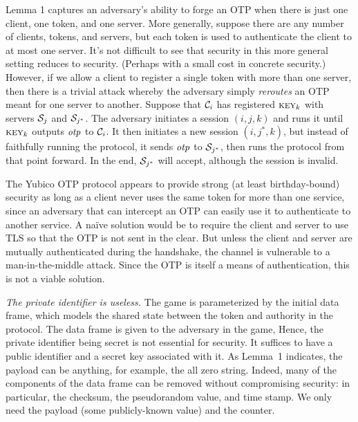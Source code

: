 Lemma 1 captures an adversary's ability to forge an OTP when there is just one
client, one token, and one server. More generally, suppose there are any number
of clients, tokens, and servers, but each token is used to authenticate the
client to at most one server. It's not difficult to see that security in this
more general setting reduces to \forge security. (Perhaps with a small cost in
concrete security.)
%
However, if we allow a client to register a single token with more than
one server, then there is a trivial attack whereby the adversary simply
\emph{reroutes} an OTP meant for one server to another.
%
Suppose that $\mathcal{C}_i$ has registered $\textsc{key}_k$ with servers $\mathcal{S}_j$ and
$\mathcal{S}_{j^*}$.
%
The adversary initiates a session $(i,j,k)$ and runs it until $\textsc{key}_k$ outputs
$\mathit{otp}$ to $\mathcal{C}_i$.
%
It then initiates a new session $(i,j^*,k)$, but instead of faithfully running
the protocol, it sends $\mathit{otp}$ to $\mathcal{S}_{j^*}$, then runs the protocol from that
point forward. In the end, $\mathcal{S}_{j^*}$ will accept, although the session is
invalid.

%
The Yubico OTP protocol appears to provide strong (at least birthday-bound)
security as long as a client never uses the same token for more than one
service, since an adversary that can intercept an OTP can easily use it to
authenticate to another service.
%
A na\"ive solution would be to require the client and server to use TLS so that
the OTP is not sent in the clear. But unless the client and server are mutually
authenticated during the handshake, the channel is vulnerable to a
man-in-the-middle attack. Since the OTP is itself a means of authentication,
this is not a viable solution.

\textit{The private identifier is useless.}
The \forge game is parameterized by the initial data frame, which models the
shared state between the token and authority in the protocol.  The data frame is
given to the adversary in the game, Hence, the private identifier being secret
is not essential for security. It suffices to have a public identifier and a
secret key associated with it. As Lemma~1 indicates, the payload can be
anything, for example, the all zero string. Indeed, many of the components of
the data frame can be removed without compromising security: in particular, the
checksum, the pseudorandom value, and time stamp. We only need the payload (some
publicly-known value) and the counter.
